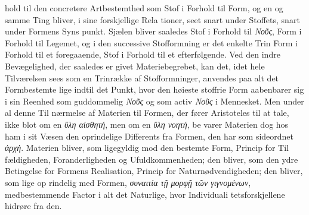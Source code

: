 \documentclass[12pt,a4paper]{book}
\newcommand{\gk}[1]{\textit{#1}}
\begin{document}
hold til den concretere Artbestemthed som Stof i Forhold til
Form, og en og samme Ting bliver, i sine forskjellige Rela\-%
tioner, seet snart under Stoffets, snart under Formens Syns\-%
punkt. Sjælen bliver saaledes Stof i Forhold til \gk{Νοῦς}, Form
i Forhold til Legemet, og i den successive Stofformning er det
enkelte Trin Form i Forhold til et foregaaende, Stof i Forhold
til et efterfølgende. Ved den indre Bevægelighed, der saaledes
er givet Materiebegrebet, kan det, idet hele Tilværelsen sees
som en Trinrække af Stofformninger, anvendes paa alt det
Formbestemte lige indtil det Punkt, hvor den høieste stoffrie
Form aabenbarer sig i sin Reenhed som guddommelig \gk{Νοῦς}
og som activ \gk{Νοῦς} i Mennesket. Men under al denne Til\-%
nærmelse af Materien til Formen, der fører Aristoteles til at
tale, ikke blot om en \gk{ὕλη αἰσθητή}, men om en \gk{ὕλη νοητή}, be\-%
varer Materien dog hos ham i sit Væsen den oprindelige
Differents fra Formen, den har som sideordnet \gk{ἀρχὴ}. Materien
bliver, som ligegyldig mod den bestemte Form, Princip for Til\-%
fældigheden, Foranderligheden og Ufuldkommenheden; den
bliver, som den ydre Betingelse for Formens Realisation,
Princip for Naturnødvendigheden; den bliver, som lige op\-%
rindelig med Formen, \gk{συναιτία τῇ μορφῇ τῶν γιγνομένων},
medbestemmende Factor i alt det Naturlige, hvor Individuali\-%
tetsforskjellene hidrøre fra den.
\end{document}
